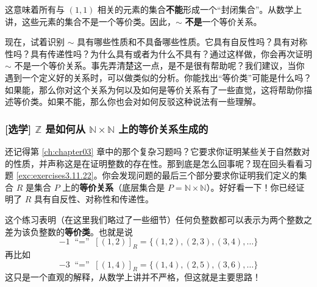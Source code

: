\begin{example}
    这意味着所有与 $(1, 1)$ 相关的元素的集合\textbf{不能}形成一个``封闭集合''。从数学上讲，这些元素的集合不是一个等价类。因此，$\sim$ \textbf{不是}一个等价关系。

    现在，试着识别 $\sim$ 具有哪些性质和不具备哪些性质。它具有自反性吗？具有对称性吗？具有传递性吗？为什么具有或者为什么不具有？通过这样做，你会再次证明 $\sim$ 不是一个等价关系。事先弄清楚这一点，是不是很有帮助呢？我们建议，当你遇到一个定义好的关系时，可以做类似的分析。你能找出``等价类''可能是什么吗？如果能，那么你对这个关系为何以及如何是等价关系有了一些直觉，这将帮助你描述等价类。如果不能，那么你也会对如何反驳这种说法有一些理解。
\end{example}

\subsubsection*{[选学] $\mathbb{Z}$ 是如何从 $\mathbb{N} \times \mathbb{N}$ 上的等价关系生成的}

还记得第 \ref{ch:chapter03} 章中的那个复杂习题吗？它要求你证明某些关于自然数对的性质，并声称这是在证明整数的存在性。那到底是怎么回事呢？现在回头看看习题 \ref{exc:exercises3.11.22}。你会发现问题的最后三个部分要求你证明我们定义的集合 $R$ 是集合 $P$ 上的\textbf{等价关系}（底层集合是 $P = \mathbb{N} \times \mathbb{N}$）。好好看一下！你已经证明了 $R$ 具有自反性、对称性和传递性。

这个练习表明（在这里我们略过了一些细节）任何负整数都可以表示为两个整数之差为该负整数的\textbf{等价类}。也就是说
\[-1 \;\text{``$=$''}\; [(1, 2)]_R = \{(1, 2),(2, 3),(3, 4), \dots \}\]
再比如
\[-3 \;\text{``$=$''}\; [(1, 4)]_R = \{(1, 4),(2, 5),(3, 6), \dots \}\]
这只是一个直观的解释，从数学上讲并不严格，但这就是主要思路！
